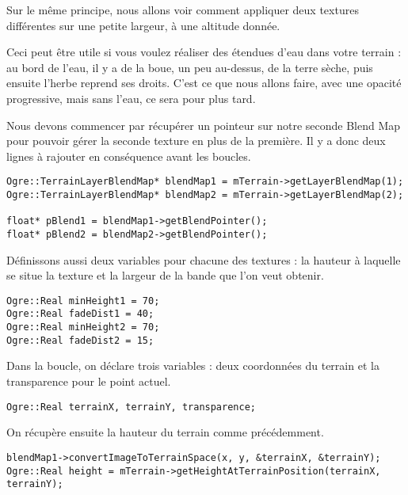 \documentclass[10pt,a4paper]{report}
\begin{document}
Sur le m\^eme principe, nous allons voir comment appliquer deux textures diff\'erentes sur une petite largeur, \`a une altitude donn\'ee.

Ceci peut \^etre utile si vous voulez r\'ealiser des \'etendues d'eau dans votre terrain : au bord de l'eau, il y a de la boue, un peu au-dessus, de la terre s\`eche, puis ensuite l'herbe reprend ses droits. C'est ce que nous allons faire, avec une opacit\'e progressive, mais sans l'eau, ce sera pour plus tard.

Nous devons commencer par r\'ecup\'erer un pointeur sur notre seconde Blend Map pour pouvoir g\'erer la seconde texture en plus de la premi\`ere. Il y a donc deux lignes \`a rajouter en cons\'equence avant les boucles.




\begin{lstlisting}[caption={R\'ecup\'eration des Blend Map pour le premier et le second terrain}]
Ogre::TerrainLayerBlendMap* blendMap1 = mTerrain->getLayerBlendMap(1);
Ogre::TerrainLayerBlendMap* blendMap2 = mTerrain->getLayerBlendMap(2);

float* pBlend1 = blendMap1->getBlendPointer();
float* pBlend2 = blendMap2->getBlendPointer();
\end{lstlisting}

D\'efinissons aussi deux variables pour chacune des textures : la hauteur \`a laquelle se situe la texture et la largeur de la bande que l'on veut obtenir.

\begin{lstlisting}[caption={}]
Ogre::Real minHeight1 = 70;
Ogre::Real fadeDist1 = 40;
Ogre::Real minHeight2 = 70;
Ogre::Real fadeDist2 = 15;
\end{lstlisting}

Dans la boucle, on d\'eclare trois variables : deux coordonn\'ees du terrain et la transparence pour le point actuel.

\begin{lstlisting}[caption={}]
Ogre::Real terrainX, terrainY, transparence;
\end{lstlisting}

On r\'ecup\`ere ensuite la hauteur du terrain comme pr\'ec\'edemment.

\begin{lstlisting}[caption={}]
blendMap1->convertImageToTerrainSpace(x, y, &terrainX, &terrainY);
Ogre::Real height = mTerrain->getHeightAtTerrainPosition(terrainX, terrainY);
\end{lstlisting}
\end{document}
